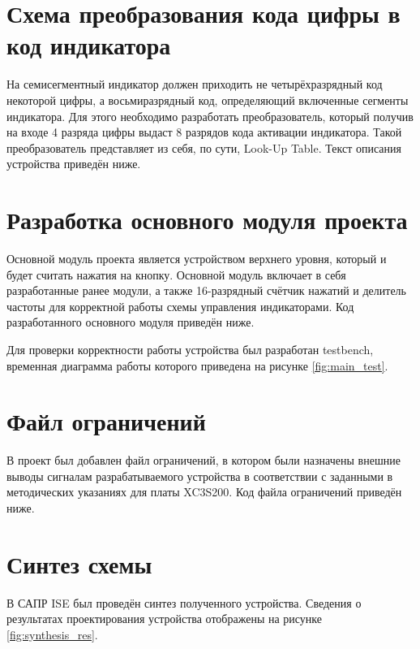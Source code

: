\documentclass[a4paper, 14pt]{extarticle}
\begin{document}
    \section{Схема преобразования кода цифры в код индикатора}
    На семисегментный индикатор должен приходить не четырёхразрядный код некоторой цифры, а восьмиразрядный код, определяющий включенные сегменты индикатора.
    Для этого необходимо разработать преобразователь, который получив на входе 4 разряда цифры выдаст 8 разрядов кода активации индикатора.
    Такой преобразователь представляет из себя, по сути, Look-Up Table.
    Текст описания устройства приведён ниже.

    \section{Разработка основного модуля проекта}
    Основной модуль проекта является устройством верхнего уровня, который и будет считать нажатия на кнопку.
    Основной модуль включает в себя разработанные ранее модули, а также 16-разрядный счётчик нажатий и делитель частоты для корректной работы схемы управления индикаторами.
    Код разработанного основного модуля приведён ниже.

    Для проверки корректности работы устройства был разработан testbench, временная диаграмма работы которого приведена на рисунке \ref{fig:main_test}.

    \section{Файл ограничений}
    В проект был добавлен файл ограничений, в котором были назначены внешние выводы сигналам разрабатываемого устройства в соответствии с заданными в методических указаниях для платы XC3S200.
    Код файла ограничений приведён ниже.

    \section{Синтез схемы}
    В САПР ISE был проведён синтез полученного устройства. Сведения о результатах проектирования устройства отображены на рисунке \ref{fig:synthesis_res}. 
\end{document}
